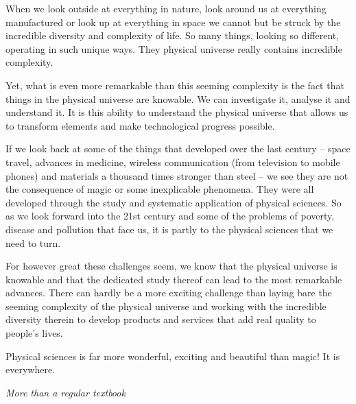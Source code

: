 { \Large
When we look outside at everything in nature, look around us at everything manufactured or look up at everything in space we cannot but be struck by the incredible diversity and complexity of life. So many things, looking so different, operating in such unique ways. They physical universe really contains incredible complexity.\par

Yet, what is even more remarkable than this seeming complexity is the fact that things in the physical universe are knowable. We can investigate it, analyse it and understand it. It is this ability to understand the physical universe that allows us to transform elements and make technological progress possible.\par

If we look back at some of the things that developed over the last century – space travel, advances in medicine, wireless communication (from television to mobile phones) and materials a thousand times stronger than steel – we see they are not the consequence of magic or some inexplicable phenomena. They were all developed through the study and systematic application of physical sciences. So as we look forward into the 21st century and some of the problems of poverty, disease and pollution that face us, it is partly to the physical sciences that we need to turn. \par

For however great these challenges seem, we know that the physical universe is knowable and that the dedicated study thereof can lead to the most remarkable advances. There can hardly be a more exciting challenge than laying bare the seeming complexity of the physical universe and working with the incredible diversity therein to develop products and services that add real quality to people’s lives.\par

Physical sciences is far more wonderful, exciting and beautiful than magic! It is everywhere.

\par

}






\newpage
\thispagestyle{empty}

{\normalfont\sffamily\fontsize{22}\normalfont\itshape More than a regular textbook} \par

